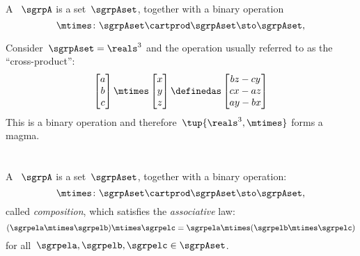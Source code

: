 
\begin{definition}[Magma]
  \label{def:magma}
  A \emph{}~$\sgrpA$ is a set~$\sgrpAset$, together with a binary operation
  \begin{equation}
    \mtimes  \colon \sgrpAset \cartprod \sgrpAset \sto \sgrpAset,
  \end{equation}
 \end{definition}

\begin{example}
  \label{ex:cross_prod}
  Consider~$\sgrpAset=\reals^3$ and the operation usually referred to as the ``cross-product'':
  \begin{equation*}
    \begin{bmatrix}
      a\\ b\\ c
\end{bmatrix}\mtimes \begin{bmatrix} x\\ y \\ z\end{bmatrix}\definedas
\begin{bmatrix}
  bz-cy\\
  cx-az\\
  ay-bx
\end{bmatrix}
\end{equation*}
  This is a binary operation and therefore~$\tup{\reals^3,\mtimes}$ forms a magma.
\end{example}

\section{}\label{sec:semigroups}

\begin{ctdefinition}[Semigroup]
  \label{def:semigroup}
  A \emph{}~$\sgrpA$ is a set~$\sgrpAset$, together with a binary operation:
  \begin{equation}
    \mtimes  \colon \sgrpAset \cartprod \sgrpAset \sto \sgrpAset,
  \end{equation}
  called \emph{composition}, which satisfies the \emph{associative} law:
  \begin{equation}
    \label{eq:semigroup-associative}
    (\sgrpela \mtimes   \sgrpelb)\mtimes   \sgrpelc
    = \sgrpela \mtimes   (\sgrpelb \mtimes  \sgrpelc)
  \end{equation}
  for all~$\sgrpela , \sgrpelb, \sgrpelc \in \sgrpAset$.
\end{ctdefinition}


